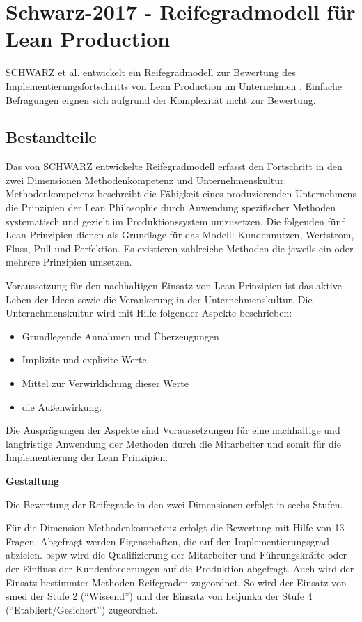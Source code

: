 \section{Schwarz-2017 - Reifegradmodell für Lean Production}

SCHWARZ et al. entwickelt ein Reifegradmodell zur Bewertung des Implementierungsfortschritts von Lean Production im Unternehmen \cite{Schwarz2017}. Einfache Befragungen eignen sich aufgrund der Komplexität nicht zur Bewertung. 

\subsection{Bestandteile}
Das von SCHWARZ entwickelte Reifegradmodell erfasst den Fortschritt in den zwei Dimensionen Methodenkompetenz und Unternehmenskultur. 
Methodenkompetenz beschreibt die Fähigkeit eines produzierenden Unternehmens die Prinzipien der Lean Philosophie durch Anwendung spezifischer Methoden systematisch und gezielt im Produktionssystem umzusetzen. 
Die folgenden fünf Lean Prinzipien dienen als Grundlage für das Modell: Kundennutzen, Wertstrom, Fluss, Pull und Perfektion. 
Es existieren zahlreiche Methoden die jeweils ein oder mehrere Prinzipien umsetzen. 

Voraussetzung für den nachhaltigen Einsatz von Lean Prinzipien ist das aktive Leben der Ideen sowie die Verankerung in der Unternehmenskultur. %
Die Unternehmenskultur wird mit Hilfe folgender Aspekte beschrieben: 
\begin{itemize}
 \item Grundlegende Annahmen und Überzeugungen
\item Implizite und explizite Werte 
\item Mittel zur Verwirklichung dieser Werte
\item die Außenwirkung.
\end{itemize}
Die Ausprägungen der Aspekte sind Voraussetzungen für eine nachhaltige und langfristige Anwendung der Methoden durch die Mitarbeiter und somit für die Implementierung der Lean Prinzipien. 

\textbf{Gestaltung}

Die Bewertung der Reifegrade in den zwei Dimensionen erfolgt in sechs Stufen. %


Für die Dimension Methodenkompetenz erfolgt die Bewertung mit Hilfe von 13 Fragen. Abgefragt werden Eigenschaften, die auf den Implementierungsgrad abzielen. \Gls{bspw} wird die Qualifizierung der Mitarbeiter und Führungskräfte oder der Einfluss der Kundenforderungen auf die Produktion abgefragt. 
Auch wird der Einsatz bestimmter Methoden Reifegraden zugeordnet. So wird der Einsatz von \gls{smed} der Stufe 2 (``Wissend'') und der Einsatz von \gls{heijunka} der Stufe 4 (``Etabliert/Gesichert'') zugeordnet. 

